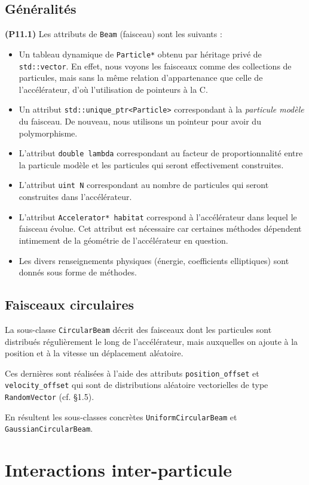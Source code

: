 \documentclass[12pt, letterpaper, twoside]{article}
\newcommand{\T}[1]{\texttt{#1}}
\begin{document}
\subsection{Généralités}
\noindent \textbf{(P11.1)} Les attributs de \T{Beam} (faisceau) sont les suivants :
\begin{itemize}
	\item Un tableau dynamique de \T{Particle*} obtenu par héritage privé de \T{std::vector}. En effet, nous voyons les faisceaux comme des collections de particules, mais sans la même relation d'appartenance que celle de l'accélérateur, d'où l'utilisation de pointeurs à la C.
	\item Un attribut \T{std::unique\_ptr<Particle>} correspondant à la \textit{particule modèle} du faisceau. De nouveau, nous utilisons un pointeur pour avoir du polymorphisme.
	\item L'attribut \T{double lambda} correspondant au facteur de proportionnalité entre la particule modèle et les particules qui seront effectivement construites.
	\item L'attribut \T{uint N} correspondant au nombre de particules qui seront construites dans l'accélérateur.
	\item L'attribut \T{Accelerator* habitat} correspond à l'accélérateur dans lequel le faisceau évolue. Cet attribut est nécessaire car certaines méthodes dépendent intimement de la géométrie de l'accélérateur en question.
	\item Les divers renseignements physiques (énergie, coefficients elliptiques) sont donnés sous forme de méthodes.
\end{itemize}

\subsection{Faisceaux circulaires}
\noindent La sous-classe \T{CircularBeam} décrit des faisceaux dont les particules sont distribués régulièrement le long de l'accélérateur, mais auxquelles on ajoute à la position et à la vitesse un déplacement aléatoire.

Ces dernières sont réalisées à l'aide des attributs \T{position\_offset} et \T{velocity\_offset} qui sont de distributions aléatoire vectorielles de type \T{RandomVector} (cf. \S1.5).

En résultent les sous-classes concrètes \T{UniformCircularBeam} et \T{GaussianCircularBeam}.

\section{Interactions inter-particule}
\end{document}
